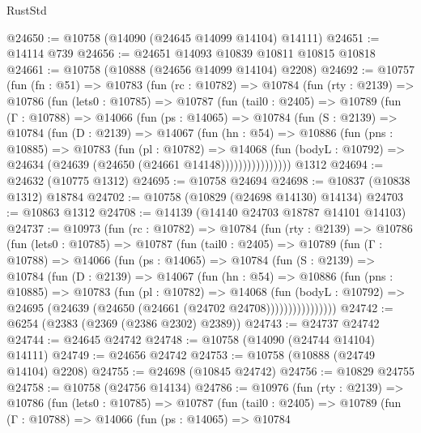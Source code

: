 \begin{lexlean}{RustStd}
\begin{coremodule}
@24650 := @10758 (@14090 (@24645 @14099 @14104) @14111)
@24651 := @14114 @739
@24656 := @24651 @14093 @10839 @10811 @10815 @10818
@24661 := @10758 (@10888 (@24656 @14099 @14104) @2208)
@24692 := @10757
    (fun (fn : @51) =>
    @10783
      (fun (rc : @10782) =>
      @10784
        (fun (rty : @2139) =>
        @10786
          (fun (lets0 : @10785) =>
          @10787
            (fun (tail0 : @2405) =>
            @10789
              (fun (Γ : @10788) =>
              @14066
                (fun (ps : @14065) =>
                @10784
                  (fun (S : @2139) =>
                  @10784
                    (fun (D : @2139) =>
                    @14067
                      (fun (hn : @54) =>
                      @10886
                        (fun (pns : @10885) =>
                        @10783
                          (fun (pl : @10782) =>
                          @14068
                            (fun (bodyL : @10792) =>
                            @24634 (@24639 (@24650 (@24661 @14148))))))))))))))))
    @1312
@24694 := @24632 (@10775 @1312)
@24695 := @10758 @24694
@24698 := @10837 (@10838 @1312) @18784
@24702 := @10758 (@10829 (@24698 @14130) @14134)
@24703 := @10863 @1312
@24708 := @14139 (@14140 @24703 @18787 @14101 @14103)
@24737 := @10973
    (fun (rc : @10782) =>
    @10784
      (fun (rty : @2139) =>
      @10786
        (fun (lets0 : @10785) =>
        @10787
          (fun (tail0 : @2405) =>
          @10789
            (fun (Γ : @10788) =>
            @14066
              (fun (ps : @14065) =>
              @10784
                (fun (S : @2139) =>
                @10784
                  (fun (D : @2139) =>
                  @14067
                    (fun (hn : @54) =>
                    @10886
                      (fun (pns : @10885) =>
                      @10783
                        (fun (pl : @10782) =>
                        @14068
                          (fun (bodyL : @10792) =>
                          @24695 (@24639 (@24650 (@24661 (@24702 @24708))))))))))))))))
@24742 := @6254 (@2383 (@2369 (@2386 @2302) @2389))
@24743 := @24737 @24742
@24744 := @24645 @24742
@24748 := @10758 (@14090 (@24744 @14104) @14111)
@24749 := @24656 @24742
@24753 := @10758 (@10888 (@24749 @14104) @2208)
@24755 := @24698 (@10845 @24742)
@24756 := @10829 @24755
@24758 := @10758 (@24756 @14134)
@24786 := @10976
    (fun (rty : @2139) =>
    @10786
      (fun (lets0 : @10785) =>
      @10787
        (fun (tail0 : @2405) =>
        @10789
          (fun (Γ : @10788) =>
          @14066
            (fun (ps : @14065) =>
            @10784

\end{coremodule}
\end{lexlean}
